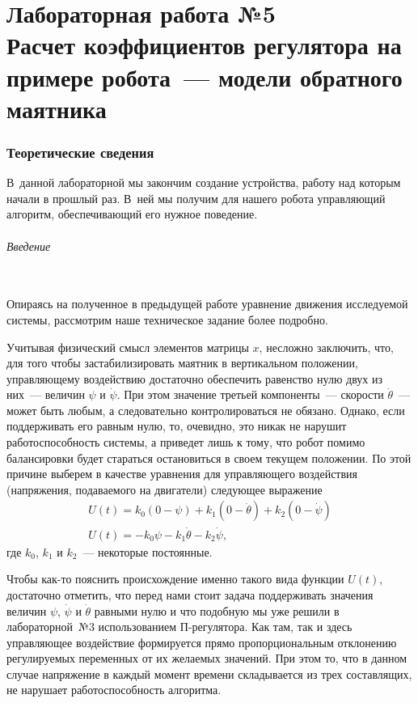 \documentclass[12pt,a4paper,openany]{extarticle}
\begin{document}
\part*{Лабораторная работа №5\\
Расчет коэффициентов регулятора на примере робота~--- модели обратного маятника}

\section{Теоретические сведения}
\hspace*{\parindent}В~данной лабораторной мы закончим создание устройства, работу над которым начали в прошлый раз.
В~ней мы получим для нашего робота управляющий алгоритм, обеспечивающий его нужное поведение.

\paragraph*{Введение}$\phantom{-}$\\
\hspace*{\parindent}Опираясь на полученное в предыдущей работе уравнение движения исследуемой системы, рассмотрим наше техническое задание более подробно.
 
Учитывая физический смысл элементов матрицы $x$, несложно заключить, что, для того чтобы застабилизировать маятник в вертикальном положении, управляющему воздействию достаточно обеспечить равенство нулю двух из них~--- величин $\psi$ и $\dot\psi$. 
При этом значение третьей компоненты~--- скорости $\dot\theta$~--- может быть любым, а следовательно контролироваться не обязано.
Однако, если поддерживать его равным нулю, то, очевидно, это никак не нарушит работоспособность системы, а приведет лишь к тому, что робот помимо балансировки будет стараться остановиться в своем текущем положении.
По этой причине выберем в качестве уравнения для управляющего воздействия (напряжения, подаваемого на двигатели) следующее выражение
\begin{gather}
	U(t) = k_0(0 - \psi) + k_1(0 - \dot\theta) + k_2(0 - \dot{\psi})\label{control_form1}\\
	U(t) = -k_0\psi - k_1\dot\theta - k_2\dot{\psi}\label{control_form2},
\end{gather}  
где $k_0$, $k_1$ и $k_2$~--- некоторые постоянные.

Чтобы как-то пояснить происхождение именно такого вида функции $U(t)$, достаточно отметить, что перед нами стоит задача поддерживать значения величин $\psi$, $\dot\psi$ и $\dot\theta$ равными нулю и что подобную мы уже решили в лабораторной~№3 использованием П-регулятора.
Как там, так и здесь управляющее воздействие формируется прямо пропорциональным отклонению регулируемых переменных от их желаемых значений. 
При этом то, что в данном случае напряжение в каждый момент времени складывается из трех составлящих, не нарушает работоспособность алгоритма.
\end{document}
